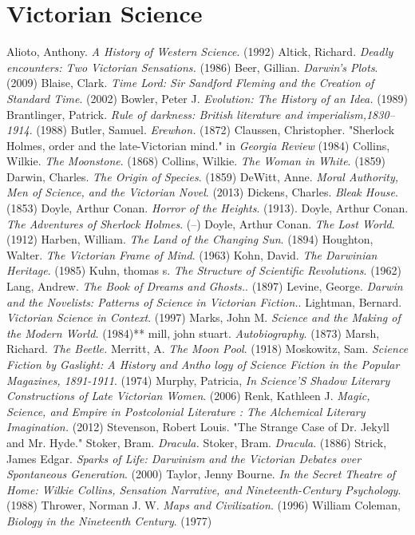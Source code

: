 \documentclass[11pt]{article}
\begin{document}
\section*{Victorian Science}
\label{sec-3}
Alioto, Anthony. \emph{A History of Western Science}. (1992)
Altick, Richard. \emph{Deadly encounters: Two Victorian Sensations.} (1986)
Beer, Gillian. \emph{Darwin's Plots}. (2009)
Blaise, Clark. \emph{Time Lord: Sir Sandford Fleming and the Creation of Standard Time}. (2002)
Bowler, Peter J. \emph{Evolution: The History of an Idea.} (1989)
Brantlinger, Patrick. \emph{Rule of darkness: British literature and imperialism,1830–1914}. (1988)
Butler, Samuel. \emph{Erewhon.} (1872)
Claussen, Christopher. "Sherlock Holmes, order and the late-Victorian mind." in \emph{Georgia Review} (1984)
Collins, Wilkie. \emph{The Moonstone}. (1868)
Collins, Wilkie. \emph{The Woman in White}. (1859)
Darwin, Charles. \emph{The Origin of Species}. (1859)
DeWitt, Anne. \emph{Moral Authority, Men of Science, and the Victorian Novel}. (2013)
Dickens, Charles. \emph{Bleak House}. (1853)
Doyle, Arthur Conan. \emph{Horror of the Heights}. (1913).
Doyle, Arthur Conan. \emph{The Adventures of Sherlock Holmes}. (--)
Doyle, Arthur Conan. \emph{The Lost World}. (1912)
Harben, William. \emph{The Land of the Changing Sun}. (1894)
Houghton, Walter. \emph{The Victorian Frame of Mind}. (1963)
Kohn, David. \emph{The Darwinian Heritage}. (1985)
Kuhn, thomas s. \emph{The Structure of Scientific Revolutions}. (1962)
Lang, Andrew. \emph{The Book of Dreams and Ghosts.}. (1897)
Levine, George. \emph{Darwin and the Novelists: Patterns of Science in Victorian Fiction.}. 
Lightman, Bernard. \emph{Victorian Science in Context}. (1997)
Marks, John M. \emph{Science and the Making of the Modern World.} (1984)** mill, john stuart. \emph{Autobiography}. (1873)
Marsh, Richard. \emph{The Beetle.}
Merritt, A. \emph{The Moon Pool}. (1918)
Moskowitz, Sam. \emph{Science Fiction by Gaslight: A History and Antho logy of Science Fiction in the Popular Magazines, 1891-1911}. (1974)
Murphy, Patricia, \emph{In Science’S Shadow Literary Constructions of Late Victorian Women}. (2006)
Renk, Kathleen J. \emph{Magic, Science, and Empire in Postcolonial Literature : The Alchemical Literary Imagination.} (2012)
Stevenson, Robert Louis. "The Strange Case of Dr. Jekyll and Mr. Hyde."
Stoker, Bram. \emph{Dracula.}
Stoker, Bram. \emph{Dracula}. (1886)
Strick, James Edgar. \emph{Sparks of Life: Darwinism and the Victorian Debates over Spontaneous Generation}. (2000)
Taylor, Jenny Bourne. \emph{In the Secret Theatre of Home: Wilkie Collins, Sensation Narrative, and Nineteenth-Century Psychology}. (1988)
Thrower, Norman J. W. \emph{Maps and Civilization}. (1996)
William Coleman, \emph{Biology in the Nineteenth Century}. (1977)
\end{document}
